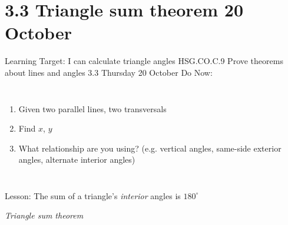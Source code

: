 \documentclass[onlytextwidth, aspectratio=169]{beamer}
\newcommand\paraticks{}
\def\paraticks{{Straight Barb[reversed, scale=2]}-{Straight Barb[scale=2]}}
\begin{document}
\section{3.3 Triangle sum theorem \hfill 20 October \,}
\begin{frame}{Learning Target: I can calculate triangle angles}
{HSG.CO.C.9 Prove theorems about lines and angles  \hfill \alert{3.3 Thursday 20 October}}
  Do Now: 
  \begin{columns}
    \begin{enumerate}
      \item Given two parallel lines, two transversals
      \item Find $x$, $y$
      \item What relationship are you using? (e.g. vertical angles, same-side exterior angles, alternate interior angles)
    \end{enumerate}
  \end{columns} \vspace{0.8cm}
  Lesson: The sum of a triangle's \emph{interior} angles is $180^\circ$ \par \medskip 
  \hspace{1.2cm} \emph{Triangle sum theorem}
\end{frame}
\end{document}
